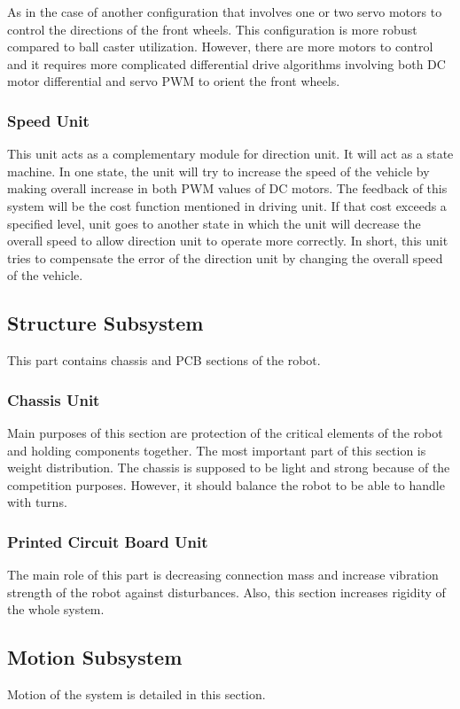 \documentclass[a4paper,12pt]{article}
\begin{document}
As in the case of another configuration that involves one or two servo motors to control the directions of the front wheels. This configuration is more robust compared to ball caster utilization. However, there are more motors to control and it requires more complicated differential drive algorithms involving both DC motor differential and servo PWM to orient the front wheels.
\subsubsection{Speed Unit}

This unit acts as a complementary module for direction unit. It will act as a state machine. In one state, the unit will try to increase the speed of the vehicle by making overall increase in both PWM values of DC motors. The feedback of this  system will be the cost function mentioned in driving unit. If that cost exceeds a specified level, unit goes to another state in which the unit will decrease the overall speed to allow direction unit to operate more correctly. In short, this unit tries to compensate the error of the direction unit by changing the overall speed of the vehicle.
 

\subsection{Structure Subsystem}
This part contains chassis and PCB sections of the robot. 
\subsubsection{Chassis Unit}
Main purposes of this section are protection of the critical elements of the robot and holding components together. The most important part of this section is weight distribution. The chassis is supposed to be light and strong because of the competition purposes. However, it should balance the robot to be able to handle with turns. 
\subsubsection{Printed Circuit Board Unit}
The main role of this part is decreasing connection mass and increase vibration strength of the robot against disturbances. Also, this section increases rigidity of the whole system. 
\subsection{Motion Subsystem}
Motion of the system is detailed in this section.
\end{document}
